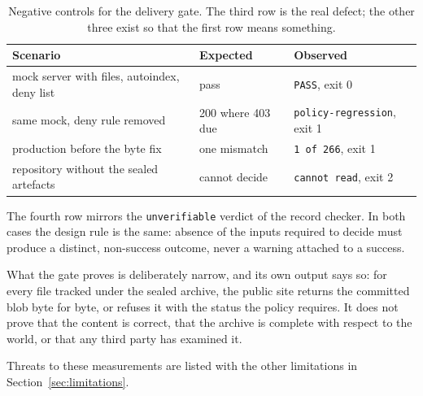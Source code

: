 \begin{table}[t]
\centering
\small
\begin{tabular}{@{}lll@{}}
\toprule
Scenario & Expected & Observed \\
\midrule
mock server with files, autoindex, deny list & pass              & \texttt{PASS}, exit 0 \\
same mock, deny rule removed                 & 200 where 403 due & \texttt{policy-regression}, exit 1 \\
production before the byte fix               & one mismatch      & \texttt{1 of 266}, exit 1 \\
repository without the sealed artefacts      & cannot decide     & \texttt{cannot read}, exit 2 \\
\bottomrule
\end{tabular}
\caption{Negative controls for the delivery gate. The third row is the real
defect; the other three exist so that the first row means something.}
\label{tab:gate-controls}
\end{table}

The fourth row mirrors the \texttt{unverifiable} verdict of the record checker.
In both cases the design rule is the same: absence of the inputs required to
decide must produce a distinct, non-success outcome, never a warning attached to
a success.

What the gate proves is deliberately narrow, and its own output says so: for
every file tracked under the sealed archive, the public site returns the
committed blob byte for byte, or refuses it with the status the policy requires.
It does not prove that the content is correct, that the archive is complete with
respect to the world, or that any third party has examined it.

Threats to these measurements are listed with the other limitations in
Section~\ref{sec:limitations}.


